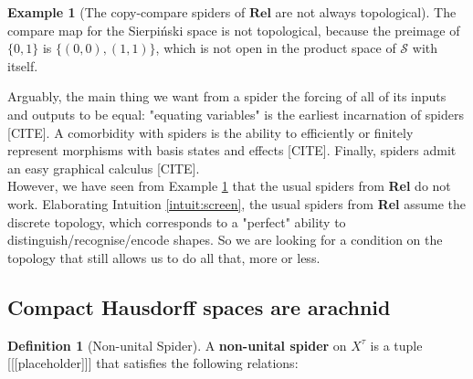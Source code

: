 \documentclass{tufte-handout}
\theoremstyle{definition}
\newtheorem{defn}[theorem]{Definition}
\newtheorem{example}[theorem]{Example}
\newtheorem{rem}[theorem]{Reminder}
\begin{document}
\begin{example}[The copy-compare spiders of $\mathbf{Rel}$ are not always topological]\label{ex:compnotspider}
The compare map for the Sierpi\'{n}ski space is not topological, because the preimage of $\{0,1\}$ is $\{(0,0),(1,1)\}$, which is not open in the product space of $\mathcal{S}$ with itself.
\end{example}

 Arguably, the main thing we want from a spider the forcing of all of its inputs and outputs to be equal: "equating variables" is the earliest incarnation of spiders [CITE]. A comorbidity with spiders is the ability to efficiently or finitely represent morphisms with basis states and effects [CITE]. Finally, spiders admit an easy graphical calculus [CITE].\\

However, we have seen from Example \ref{ex:compnotspider} that the usual spiders from \textbf{Rel} do not work. Elaborating Intuition \ref{intuit:screen}, the usual spiders from \textbf{Rel} assume the discrete topology, which corresponds to a "perfect" ability to distinguish/recognise/encode shapes. So we are looking for a condition on the topology that still allows us to do all that, more or less.

\subsection{ Compact Hausdorff spaces are arachnid }


\begin{defn}[Non-unital Spider]
A \textbf{non-unital spider} on $X^\tau$ is a tuple [[[placeholder]]] that satisfies the following relations:

\end{defn}
\end{document}
